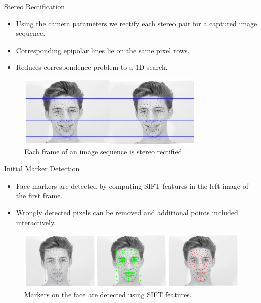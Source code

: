 \documentclass{beamer}
\begin{document}
\begin{frame}{Stereo Rectification}

\begin{itemize}
\setlength\itemsep{0.5em}
\item Using the camera parameters we rectify each stereo pair for a captured image sequence.
\item Corresponding epipolar lines lie on the same pixel rows.
\item Reduces correspondence problem to a 1D search.
\end{itemize}

\begin{center}
\begin{figure}
\includegraphics[width=0.8\textwidth]{img/epipolarlines}
\caption{\tiny{Each frame of an image sequence is stereo rectified.}}
\end{figure}
\end{center}

\end{frame}



\begin{frame}{Initial Marker Detection}

\begin{itemize}
\setlength\itemsep{0.5em}
\item Face markers are detected by computing SIFT features in the left image of the first frame.
\item Wrongly detected pixels can be removed and additional points included interactively.
\end{itemize}

\begin{center}
\begin{figure}
\includegraphics[width=1.0\textwidth]{img/detection}
\caption{\tiny{Markers on the face are detected using SIFT features.}}
\end{figure}
\end{center}

\end{frame}
\end{document}
